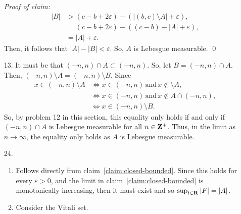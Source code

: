 \documentclass{article}
\newcommand{\eps}{\varepsilon}
\theoremstyle{remark}
\newenvironment{poc}{\textit{Proof of claim:}}{\qed\\}
\begin{document}
\begin{enumerate}[leftmargin=*]
\begin{poc}
\begin{align*}
            |B| &> (c-b+2\eps) - \left(|(b,c)\setminus A| + \eps\right), \\
            &= (c-b+2\eps) - \left((c-b) - |A| + \eps\right), \\
            &= |A| + \eps.
        \end{align*}
        Then, it follows that $|A| - |B| < \eps$. So, $A$ is Lebesgue measurable.
    \end{poc}
    \item[13.] It must be that $(-n,n) \cap A \subset (-n,n)$. So, let $B = (-n,n) \cap A$. Then,
    $(-n,n) \setminus A = (-n,n) \setminus B$. Since 
    \begin{align*}
        x \in (-n,n) \setminus A &\iff x \in (-n,n) \,\text{and}\, x\notin \setminus A, \\
        &\iff x \in (-n,n) \,\text{and}\, x \notin A \cap (-n,n), \\
        &\iff x \in (-n,n)\setminus B.
    \end{align*}
    So, by problem 12 in this section, this equality only holds if and only if $(-n,n) \cap A$ is Lebesgue 
    measurable for all $n\in \mathbf{Z}^+$. Thus, in the limit as $n\to\infty$, the equality only holds as $A$ is 
    Lebesgue measurable.
    \item[24.] \begin{enumerate}[label=(\alph*)]
        \item Follows directly from claim~\ref{claim:closed-bounded}. Since this holds for every $\eps > 0$, and the 
        limit in claim~\ref{claim:closed-bounded} is monotonically increasing, then it must exist and so 
        $\sup_{t\in\mathbf{R}} |F| = |A|$. 
        \item Consider the Vitali set.
    \end{enumerate}
\end{enumerate}
\end{document}
